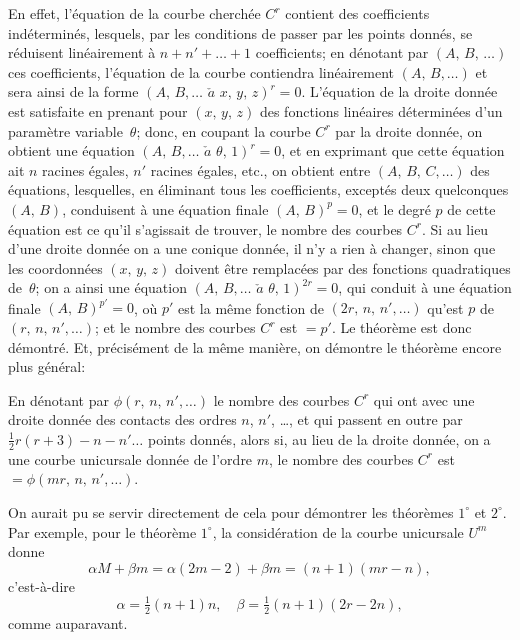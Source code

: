 \documentclass[11pt,a4paper]{article}
\theoremstyle{plain}
\theoremstyle{definition}
\begin{document}
En effet, l'\'equation de la courbe cherch\'ee $C^r$ contient des coefficients ind\'etermin\'es,
lesquels, par les conditions de passer par les points donn\'es, se r\'eduisent lin\'eairement
\`a $n + n' + \ldots + 1$ coefficients; en d\'enotant par $(A,\,B,\,\dots)$ ces coefficients, l'\'equation de la
courbe contiendra lin\'eairement $(A,\,B,\dots)$ et sera ainsi de la forme $(A,\,B,\dots\,\,\check{a}\,\,x,\,y,\,z)^r = 0$.
L'\'equation de la droite donn\'ee est satisfaite en prenant pour $(x,\,y,\,z)$ des fonctions
lin\'eaires d\'etermin\'ees d'un param\`etre variable~$\theta$; donc, en coupant la courbe $C^r$ par
la droite donn\'ee, on obtient une \'equation $(A,\,B,\dots\,\,\check{a}\,\,\theta,\,1)^r = 0$, et en exprimant que
cette \'equation ait $n$ racines \'egales, $n'$ racines \'egales, etc., on obtient entre $(A,\,B,\,C,\dots)$
des \'equations, lesquelles, en \'eliminant tous les coefficients, except\'es deux quelconques
$(A,\,B)$, conduisent \`a une \'equation finale $(A,\,B)^p = 0$, et le degr\'e $p$ de cette \'equation
est ce qu'il s'agissait de trouver, le nombre des courbes $C^r$.  Si au lieu d'une droite
donn\'ee on a une conique donn\'ee, il n'y a rien \`a changer, sinon que les coordonn\'ees
$(x,\,y,\,z)$ doivent \^etre remplac\'ees par des fonctions quadratiques de~$\theta$; on a ainsi une
\'equation $(A,\,B,\dots\,\,\check{a}\,\,\theta,\,1)^{2r} = 0$, qui conduit \`a une \'equation finale $(A,\,B)^{p'} = 0$, o\`u $p'$
est la m\^eme fonction de $(2r,\,n,\,n',\dots)$ qu'est $p$ de $(r,\,n,\,n',\dots)$; et le nombre des
courbes $C^r$ est $= p'$.  Le th\'eor\`eme est donc d\'emontr\'e.  Et, pr\'ecis\'ement de la m\^eme
mani\`ere, on d\'emontre le th\'eor\`eme encore plus g\'en\'eral:

En d\'enotant par $\phi(r,\,n,\,n',\dots)$ le nombre des courbes $C^r$ qui ont avec une droite
donn\'ee des contacts des ordres $n$, $n'$, \dots, et qui passent en outre par $\tfrac{1}{2}r(r+3) - n - n'\dots$
points donn\'es, alors si, au lieu de la droite donn\'ee, on a une courbe unicursale donn\'ee
de l'ordre $m$, le nombre des courbes $C^r$ est $= \phi(mr,\,n,\,n',\dots)$.

On aurait pu se servir directement de cela pour d\'emontrer les th\'eor\`emes $1^\circ$ et $2^\circ$.
Par exemple, pour le th\'eor\`eme $1^\circ$, la consid\'eration de la courbe unicursale $U^m$ donne
\[
\alpha M + \beta m = \alpha(2m - 2) + \beta m = (n+1)(mr - n),
\]
c'est-\`a-dire
\[
\alpha = \tfrac{1}{2}(n+1)n, \quad \beta = \tfrac{1}{2}(n+1)(2r - 2n),
\]
comme auparavant.
\end{document}
